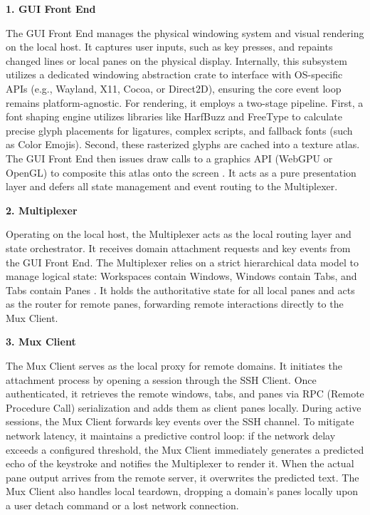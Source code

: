 \textbf{1. GUI Front End}

The GUI Front End manages the physical windowing system and visual rendering on the local host. It captures user inputs, such as key presses, and repaints changed lines or local panes on the physical display. Internally, this subsystem utilizes a dedicated windowing abstraction crate to interface with OS-specific APIs (e.g., Wayland, X11, Cocoa, or Direct2D), ensuring the core event loop remains platform-agnostic. For rendering, it employs a two-stage pipeline. First, a font shaping engine utilizes libraries like HarfBuzz and FreeType to calculate precise glyph placements for ligatures, complex scripts, and fallback fonts (such as Color Emojis). Second, these rasterized glyphs are cached into a texture atlas. The GUI Front End then issues draw calls to a graphics API (WebGPU or OpenGL) to composite this atlas onto the screen \cite{gui-crate}. It acts as a pure presentation layer and defers all state management and event routing to the Multiplexer.

\textbf{2. Multiplexer}

Operating on the local host, the Multiplexer acts as the local routing layer and state orchestrator. It receives domain attachment requests and key events from the GUI Front End. The Multiplexer relies on a strict hierarchical data model to manage logical state: Workspaces contain Windows, Windows contain Tabs, and Tabs contain Panes \cite{mux-crate}. It holds the authoritative state for all local panes and acts as the router for remote panes, forwarding remote interactions directly to the Mux Client.

\textbf{3. Mux Client}

The Mux Client serves as the local proxy for remote domains. It initiates the attachment process by opening a session through the SSH Client. Once authenticated, it retrieves the remote windows, tabs, and panes via RPC (Remote Procedure Call) serialization and adds them as client panes locally. During active sessions, the Mux Client forwards key events over the SSH channel. To mitigate network latency, it maintains a predictive control loop: if the network delay exceeds a configured threshold, the Mux Client immediately generates a predicted echo of the keystroke and notifies the Multiplexer to render it. When the actual pane output arrives from the remote server, it overwrites the predicted text. The Mux Client also handles local teardown, dropping a domain's panes locally upon a user detach command or a lost network connection.


